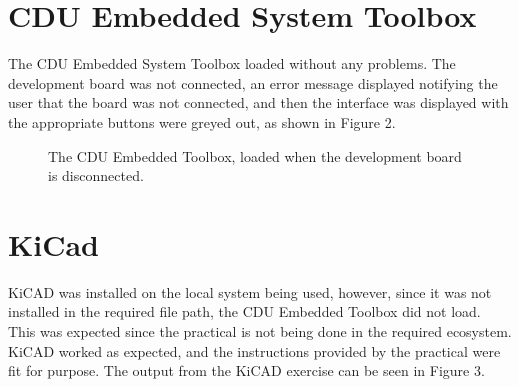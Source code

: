 \documentclass[a4paper]{article}
\begin{document}
\newpage

\section{CDU Embedded System Toolbox}
The CDU Embedded System Toolbox loaded without any problems. The development board was not connected, an error message displayed notifying the user that the board was not connected, and then the interface was displayed with the appropriate buttons were greyed out, as shown in Figure 2.

\begin{figure}[h]
	\centering
	\caption{The CDU Embedded Toolbox, loaded when the development board is disconnected.}
\end{figure}

\section{KiCad}
KiCAD was installed on the local system being used, however, since it was not installed in the required file path, the CDU Embedded Toolbox did not load. This was expected since the practical is not being done in the required ecosystem. KiCAD worked as expected, and the instructions provided by the practical were fit for purpose. The output from the KiCAD exercise can be seen in Figure 3.
\end{document}
